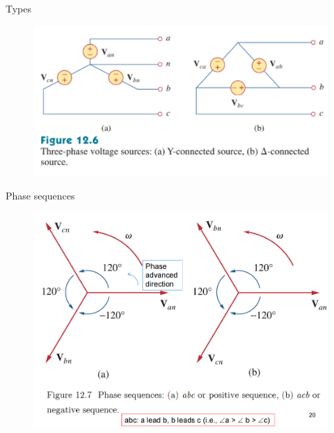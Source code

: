 \documentclass{beamer}
\begin{document}
\begin{frame}{Types}
    \begin{figure}[H]
        \centering
        \includegraphics[scale = 0.5]{C12/2.png}
        \label{fig:enter-label}
    \end{figure}
\end{frame}

\begin{frame}{Phase sequences}
    \begin{figure}[H]
        \centering
        \includegraphics[scale = 0.5]{C12/3.png}
        \label{fig:enter-label}
    \end{figure}
\end{frame}
\end{document}
